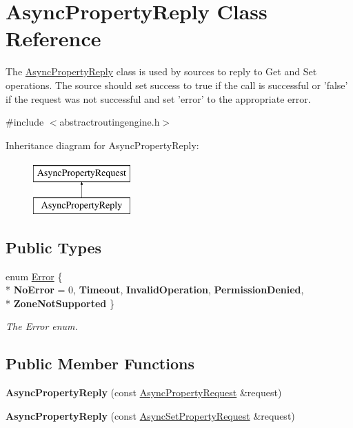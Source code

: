 \hypertarget{classAsyncPropertyReply}{\section{Async\-Property\-Reply Class Reference}
\label{classAsyncPropertyReply}
}


The \hyperlink{classAsyncPropertyReply}{Async\-Property\-Reply} class is used by sources to reply to Get and Set operations. The source should set success to true if the call is successful or 'false' if the request was not successful and set 'error' to the appropriate error.  




{\ttfamily \#include $<$abstractroutingengine.\-h$>$}

Inheritance diagram for Async\-Property\-Reply\-:\begin{figure}[H]
\begin{center}
\leavevmode
\includegraphics[height=2.000000cm]{classAsyncPropertyReply}
\end{center}
\end{figure}
\subsection*{Public Types}
\begin{DoxyCompactItemize}
\item 
enum \hyperlink{classAsyncPropertyReply_ad91affaa25fcc3b73947a6cf4591e5d1}{Error} \{ \\*
{\bfseries No\-Error} = 0, 
{\bfseries Timeout}, 
{\bfseries Invalid\-Operation}, 
{\bfseries Permission\-Denied}, 
\\*
{\bfseries Zone\-Not\-Supported}
 \}
\begin{DoxyCompactList}\small\item\em The Error enum. \end{DoxyCompactList}\end{DoxyCompactItemize}
\subsection*{Public Member Functions}
\begin{DoxyCompactItemize}
\item 
\hypertarget{classAsyncPropertyReply_a3e29405633f16c8d06c7fa25a1890427}{{\bfseries Async\-Property\-Reply} (const \hyperlink{classAsyncPropertyRequest}{Async\-Property\-Request} \&request)}\label{classAsyncPropertyReply_a3e29405633f16c8d06c7fa25a1890427}

\item 
\hypertarget{classAsyncPropertyReply_acc396dd9b00628358a293bce441ebd51}{{\bfseries Async\-Property\-Reply} (const \hyperlink{classAsyncSetPropertyRequest}{Async\-Set\-Property\-Request} \&request)}\label{classAsyncPropertyReply_acc396dd9b00628358a293bce441ebd51}

\end{DoxyCompactItemize}
